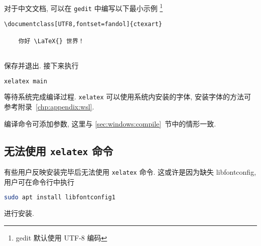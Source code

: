 对于中文文档, 可以在 \texttt{gedit} 中编写以下最小示例%
\footnote{gedit 默认使用 UTF-8 编码}%
\begin{lstlisting}[language={[LaTeX]TeX}]
  \documentclass[UTF8,fontset=fandol]{ctexart}
  
    你好 \LaTeX{} 世界！
  
\end{lstlisting}
保存并退出.
接下来执行
\begin{lstlisting}[language=bash]
  xelatex main
\end{lstlisting}
等待系统完成编译过程.
\texttt{xelatex} 可以使用系统内安装的字体,
安装字体的方法可参考附录~\ref{chp:appendix:wsl}.

编译命令可添加参数, 这里与 \ref{sec:windows:compile}~节中的情形一致.

\subsection{无法使用 \texttt{xelatex} 命令}\label{subsec:ubuntu:xelatexfail}

有些用户反映安装完毕后无法使用 \texttt{xelatex} 命令.
这或许是因为缺失 libfontconfig, 用户可在命令行中执行 
\begin{lstlisting}[language=bash]
  sudo apt install libfontconfig1
\end{lstlisting}
进行安装.
